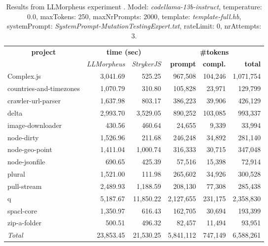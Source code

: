 
\begin{table*}[hbt!]
\centering
{\scriptsize
\begin{tabular}{l||r|r|r|r|r}
\multicolumn{1}{c|}{\bf project} & \multicolumn{2}{|c|}{\bf time (sec)} & \multicolumn{3}{|c|}{\bf \#tokens} \\
               & {\it LLMorpheus} & {\it StrykerJS} & {\bf prompt} & {\bf compl.} & {\bf total} \\
\hline
  Complex.js & 3,041.69 & 525.25 & 967,508 & 104,246 & 1,071,754 \\ 
countries-and-timezones & 1,070.79 & 310.80 & 105,828 & 23,971 & 129,799 \\ 
crawler-url-parser & 1,637.98 & 803.17 & 386,223 & 39,906 & 426,129 \\ 
delta & 2,993.70 & 3,529.05 & 890,252 & 103,085 & 993,337 \\ 
image-downloader & 430.56 & 460.64 & 24,655 & 9,339 & 33,994 \\ 
node-dirty & 1,526.96 & 211.68 & 246,248 & 34,892 & 281,140 \\ 
node-geo-point & 1,411.04 & 1,000.74 & 316,333 & 30,715 & 347,048 \\ 
node-jsonfile & 690.65 & 425.39 & 57,516 & 15,398 & 72,914 \\ 
plural & 1,521.00 & 111.98 & 265,602 & 34,926 & 300,528 \\ 
pull-stream & 2,489.93 & 1,188.59 & 208,130 & 77,308 & 285,438 \\ 
q & 5,187.67 & 11,850.22 & 2,127,655 & 231,175 & 2,358,830 \\ 
spacl-core & 1,350.97 & 616.43 & 162,705 & 30,694 & 193,399 \\ 
zip-a-folder & 500.51 & 496.32 & 82,457 & 11,494 & 93,951 \\ 
\hline
  \textit{Total} & 23,853.45 & 21,530.25 & 5,841,112 & 747,149 & 6,588,261 \\
  \end{tabular}
  }
  \\[2mm]
  \caption{Results from LLMorpheus experiment .
    Model: \textit{codellama-13b-instruct}, 
    temperature: 0.0, 
    maxTokens: 250, 
    maxNrPrompts: 2000, 
    template: \textit{template-full.hb}, 
    systemPrompt: \textit{SystemPrompt-MutationTestingExpert.txt}, 
    rateLimit: 0, 
    nrAttempts: 3.  
  }
  \label{table:Cost:run354:codellama-13b-instruct:template-full.hb:0.0}
\end{table*}